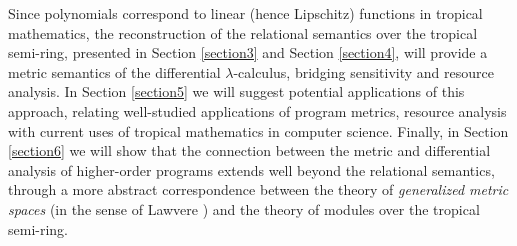 Since polynomials correspond to linear (hence Lipschitz) functions in tropical mathematics, the reconstruction of the relational semantics over the tropical semi-ring, presented in Section \ref{section3} and Section \ref{section4}, will provide a metric semantics of the differential $\lambda$-calculus, bridging sensitivity and resource analysis. 
In Section \ref{section5} we will suggest potential applications of this approach, relating well-studied applications of program metrics, resource analysis with current uses of tropical mathematics in computer science.  
Finally, in Section \ref{section6} we will show that the connection between the metric and differential analysis of higher-order programs extends well beyond the relational semantics, through a more abstract correspondence between the theory of 
\emph{generalized metric spaces} (in the sense of Lawvere \cite{}) and the theory of modules over the tropical semi-ring.









